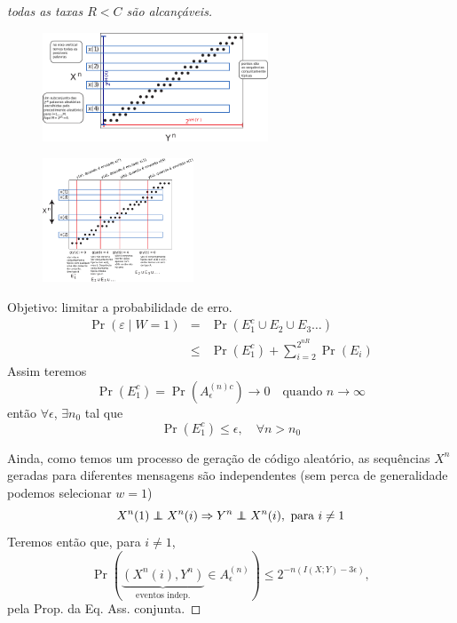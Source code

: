 \begin{frame}[allowframebreaks]
\begin{proof}[todas as taxas $R < C$ são alcançáveis]
  \proofbreak

                \begin{figure}[h!]
                \centering
                \includegraphics[width=0.6\textwidth]{images/mesmap.pdf}
                \label{fig:mesmap}
                \end{figure}

  \proofbreak
		\vspace{-0.25cm}
                \begin{figure}[h!]
                \centering
                \includegraphics[width=0.4\textwidth]{images/codmap.pdf}
                \label{fig:codmap}
                \end{figure}
  \proofbreak
 
  Objetivo: limitar a probabilidade de erro.  
  \begin{eqnarray}
  \Pr(\varepsilon \mid W = 1) &=& \Pr(E_1^c \cup E_2 \cup E_3 \ldots) \nonumber \\
			&\leq& \Pr(E_1^c) + \sum_{i=2}^{2^{nR}} \Pr(E_i) 
  \end{eqnarray}
  Assim teremos
  \begin{equation}
  \Pr(E_1^c) = \Pr(A_{\epsilon}^{(n)c}) \rightarrow 0  \quad \text{quando } n \rightarrow \infty
  \end{equation}
  então $\forall \epsilon$, $\exists n_0$ tal que
  \begin{equation}
  \Pr(E_1^c) \leq \epsilon , \quad \forall n > n_0
  \end{equation}

  \proofbreak

  Ainda, como temos um processo de geração de código aleatório, as sequências $X^n$ geradas 
  para diferentes mensagens são independentes (sem perca de generalidade podemos selecionar $w=1$)
  \begin{equation}
  X^n(1) \independent X^n(i) \Rightarrow Y^n \independent X^n(i) , \text{ para } i \neq 1
  \end{equation}
  Teremos então que, para $i \neq 1$,
  \begin{equation}
  \Pr ( \underbrace{(X^n(i) , Y^n)}_{\text{eventos indep.}} \in A_{\epsilon}^{(n)} ) \leq 2^{-n (I(X;Y) - 3 \epsilon)} ,
  \end{equation}
  pela Prop. da Eq. Ass. conjunta.
 

\end{proof}
\end{frame}
